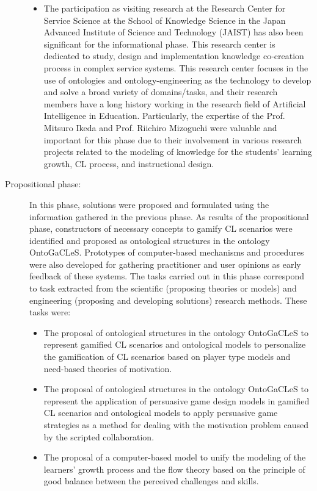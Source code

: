 \begin{description}
\begin{itemize}
\item
The participation as visiting research at the Research Center for Service Science at the School of Knowledge Science in the Japan Advanced Institute of Science and Technology (JAIST) has also been significant for the informational phase. This research center is dedicated to study, design and implementation knowledge co-creation process in complex service systems.  This research center focuses in the use of ontologies and ontology-engineering as the technology to develop and solve a broad variety of domains/tasks, and their research members have a long history working in the research field of Artificial Intelligence in Education. Particularly, the expertise of the Prof. Mitsuro Ikeda and Prof. Riichiro Mizoguchi were valuable and important for this phase due to their involvement in various research projects related to the modeling of knowledge for the students’ learning growth, CL process, and instructional design.
\end{itemize}

\item[Propositional phase:]
In this phase, solutions were proposed and formulated using the information gathered in the previous phase. As results of the propositional phase, constructors of necessary concepts to gamify CL scenarios were identified and proposed as ontological structures in the ontology OntoGaCLeS. Prototypes of computer-based mechanisms and procedures were also developed for gathering practitioner and user opinions as early feedback of these systems. The tasks carried out in this phase correspond to task extracted from the scientific (proposing theories or models) and engineering (proposing and developing solutions) research methods. These tasks were:

\begin{itemize}
\item
The proposal of ontological structures in the ontology OntoGaCLeS to represent gamified CL scenarios and ontological models to personalize the gamification of CL scenarios based on player type models and need-based theories of motivation.

\item
The proposal of ontological structures in the ontology OntoGaCLeS to represent the application of persuasive game design models in gamified CL scenarios and ontological models to apply persuasive game strategies as a method for dealing with the motivation problem caused by the scripted collaboration.

\item
The proposal of a computer-based model to unify the modeling of the learners' growth process and the flow theory based on the principle of good balance between the perceived challenges and skills.



\end{itemize}
\end{description}
